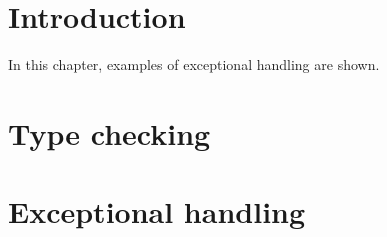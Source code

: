\section{Introduction}
In this chapter, examples of exceptional handling are shown. 



\section{Type checking}





\section{Exceptional handling}




